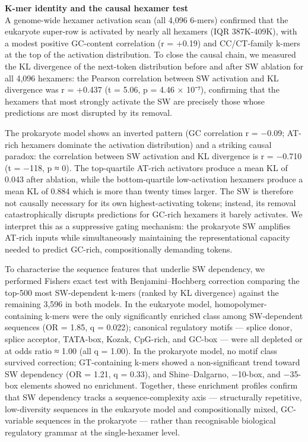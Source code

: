 \documentclass[11pt]{article}
\begin{document}
\textbf{K-mer identity and the causal hexamer test\\
}A genome-wide hexamer activation scan (all 4,096 6-mers) confirmed that
the eukaryote super-row is activated by nearly all hexamers (IQR
387K-409K), with a modest positive GC-content correlation (r = +0.19)
and CC/CT-family k-mers at the top of the activation distribution. To
close the causal chain, we measured the KL divergence of the next-token
distribution before and after SW ablation for all 4,096 hexamers: the
Pearson correlation between SW activation and KL divergence was r =
+0.437 (t = 5.06, p = 4.46 × 10⁻⁷), confirming that the hexamers that
most strongly activate the SW are precisely those whose predictions are
most disrupted by its removal.

The prokaryote model shows an inverted pattern (GC correlation r =
−0.09; AT-rich hexamers dominate the activation distribution) and a
striking causal paradox: the correlation between SW activation and KL
divergence is r = −0.710 (t = −118, p ≈ 0). The top-quartile AT-rich
activators produce a mean KL of 0.043 after ablation, while the
bottom-quartile low-activation hexamers produce a mean KL of 0.884 which
is more than twenty times larger. The SW is therefore not causally
necessary for its own highest-activating tokens; instead, its removal
catastrophically disrupts predictions for GC-rich hexamers it barely
activates. We interpret this as a suppressive gating mechanism: the
prokaryote SW amplifies AT-rich inputs while simultaneously maintaining
the representational capacity needed to predict GC-rich, compositionally
demanding tokens.

To characterise the sequence features that underlie SW dependency, we
performed Fisher\textquotesingle s exact test with Benjamini--Hochberg
correction comparing the top-500 most SW-dependent k-mers (ranked by KL
divergence) against the remaining 3,596 in both models. In the eukaryote
model, homopolymer-containing k-mers were the only significantly
enriched class among SW-dependent sequences (OR = 1.85, q = 0.022);
canonical regulatory motifs --- splice donor, splice acceptor, TATA-box,
Kozak, CpG-rich, and GC-box --- were all depleted or at odds ratio ≈
1.00 (all q = 1.00). In the prokaryote model, no motif class survived
correction; GT-containing k-mers showed a non-significant trend toward
SW dependency (OR = 1.21, q = 0.33), and Shine--Dalgarno, −10-box, and
−35-box elements showed no enrichment. Together, these enrichment
profiles confirm that SW dependency tracks a sequence-complexity axis
--- structurally repetitive, low-diversity sequences in the eukaryote
model and compositionally mixed, GC-variable sequences in the prokaryote
--- rather than recognisable biological regulatory grammar at the
single-hexamer level.
\end{document}

